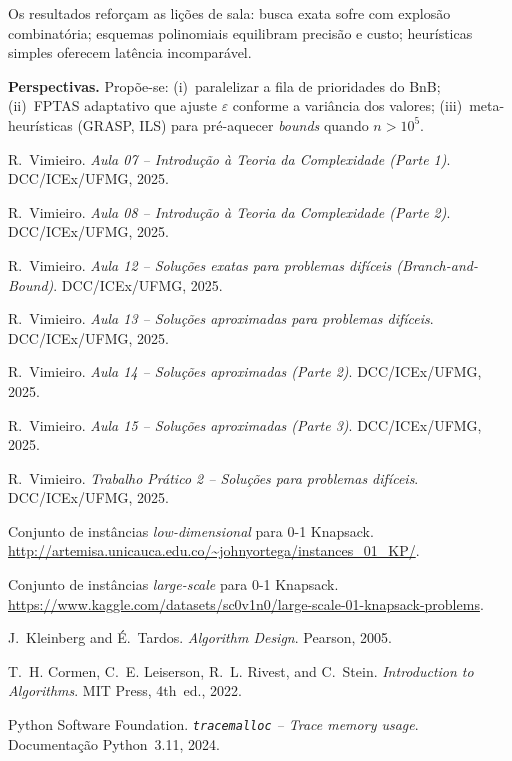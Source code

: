 \documentclass[10pt,a4paper]{article}
\begin{document}
Os resultados reforçam as lições de sala: busca exata sofre com
explosão combinatória; esquemas polinomiais equilibram precisão e
custo; heurísticas simples oferecem latência incomparável.

\vspace{.5em}\noindent
\textbf{Perspectivas.}  Propõe-se:
(i)~paralelizar a fila de prioridades do BnB;
(ii)~FPTAS adaptativo que ajuste $\varepsilon$ conforme a variância dos
valores; (iii)~meta-heurísticas (GRASP, ILS) para pré-aquecer
\emph{bounds} quando $n>10^{5}$.


\begin{thebibliography}{99}

R.~Vimieiro.
\newblock \emph{Aula 07 – Introdução à Teoria da Complexidade (Parte 1)}.
\newblock DCC/ICEx/UFMG, 2025.

R.~Vimieiro.
\newblock \emph{Aula 08 – Introdução à Teoria da Complexidade (Parte 2)}.
\newblock DCC/ICEx/UFMG, 2025.

R.~Vimieiro.
\newblock \emph{Aula 12 – Soluções exatas para problemas difíceis
  (Branch-and-Bound)}.
\newblock DCC/ICEx/UFMG, 2025.

R.~Vimieiro.
\newblock \emph{Aula 13 – Soluções aproximadas para problemas difíceis}.
\newblock DCC/ICEx/UFMG, 2025.

R.~Vimieiro.
\newblock \emph{Aula 14 – Soluções aproximadas (Parte 2)}.
\newblock DCC/ICEx/UFMG, 2025.

R.~Vimieiro.
\newblock \emph{Aula 15 – Soluções aproximadas (Parte 3)}.
\newblock DCC/ICEx/UFMG, 2025.

R.~Vimieiro.
\newblock \emph{Trabalho Prático 2 – Soluções para problemas difíceis}.
\newblock DCC/ICEx/UFMG, 2025.

Conjunto de instâncias \emph{low-dimensional} para
0-1 Knapsack.
\newblock \url{http://artemisa.unicauca.edu.co/~johnyortega/instances_01_KP/}.

Conjunto de instâncias \emph{large-scale} para 0-1 Knapsack.
\newblock \url{https://www.kaggle.com/datasets/sc0v1n0/large-scale-01-knapsack-problems}.

J.~Kleinberg and \'{E}.~Tardos.
\newblock \emph{Algorithm Design}.
\newblock Pearson, 2005.

T.~H. Cormen, C.~E. Leiserson, R.~L. Rivest, and C.~Stein.
\newblock \emph{Introduction to Algorithms}.
\newblock MIT Press, 4th~ed., 2022.

Python Software Foundation.
\newblock \emph{\texttt{tracemalloc} – Trace memory usage}.
\newblock Documentação Python~3.11, 2024.

\end{thebibliography}
\end{document}
